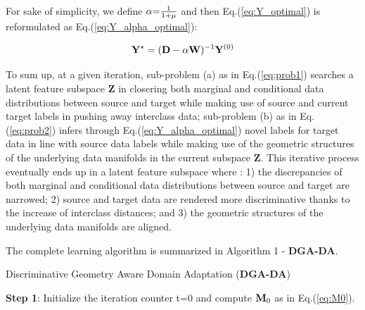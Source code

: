 \documentclass[journal,twocolumn]{IEEEtran}
\begin{document}
\begin{CJK*}{UTF8}{gkai}

For sake of simplicity, we define $\alpha {\rm{ = }}\frac{1}{{1 + \mu }}$ and then Eq.(\ref{eq:Y_optimal}) is reformulated as Eq.(\ref{eq:Y_alpha_optimal}):

\begin{equation}\label{eq:Y_alpha_optimal}
{{\bf{Y}}^ \star } = {({\bf{D}} - \alpha {\bf{W}})^{ - 1}}{{\bf{Y}}^{(0)}}
\end{equation}


								
To sum up, at a given iteration, sub-problem (a) as in Eq.(\ref{eq:prob1}) searches a latent feature subspace $\textbf{Z}$ in closering both marginal and conditional data distributions between source and target while making use of source and current target labels in pushing away interclass data; sub-problem (b) as in Eq.(\ref{eq:prob2}) infers  through Eq.(\ref{eq:Y_alpha_optimal}) novel labels for target data  in line with source data labels while making use of the geometric structures of the underlying data manifolds in the current subspace $\textbf{Z}$. This iterative process eventually ends up in a latent feature subspace where : 1) the discrepancies of both marginal and conditional data distributions between source and target are narrowed; 2)  source and target data are rendered more discriminative thanks to the increase of interclass distances; and 3) the geometric structures of the underlying data manifolds are aligned.     

The complete learning algorithm  is summarized in Algorithm 1 - \textbf{DGA-DA}.
								

\begin{algorithm}[!h]
\scriptsize
\caption{Discriminative Geometry Aware Domain Adaptation (\textbf{DGA-DA})}

\textbf{Step {1}}:  Initialize the iteration counter t=0 and compute ${{\bf{M}}_0}$ as in Eq.(\ref{eq:M0}).\\


\end{algorithm}
\end{CJK*}
\end{document}
